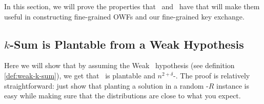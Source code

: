
In this section, we will prove the properties that \kSum~and \zkclique~have that will make them useful in constructing fine-grained OWFs and our fine-grained key exchange.

\subsection{\texorpdfstring{$k$}{}-Sum is Plantable from a Weak Hypothesis}
Here we will show that by assuming the Weak \kSum~hypothesis (see definition \ref{def:weak-k-sum}), we get that \kSum~is plantable and $n^{2+\delta}$-\ACIH. The proof is relatively straightforward: just show that planting a solution in a random \kSum-$R$ instance is easy while making sure that the distributions are close to what you expect.

